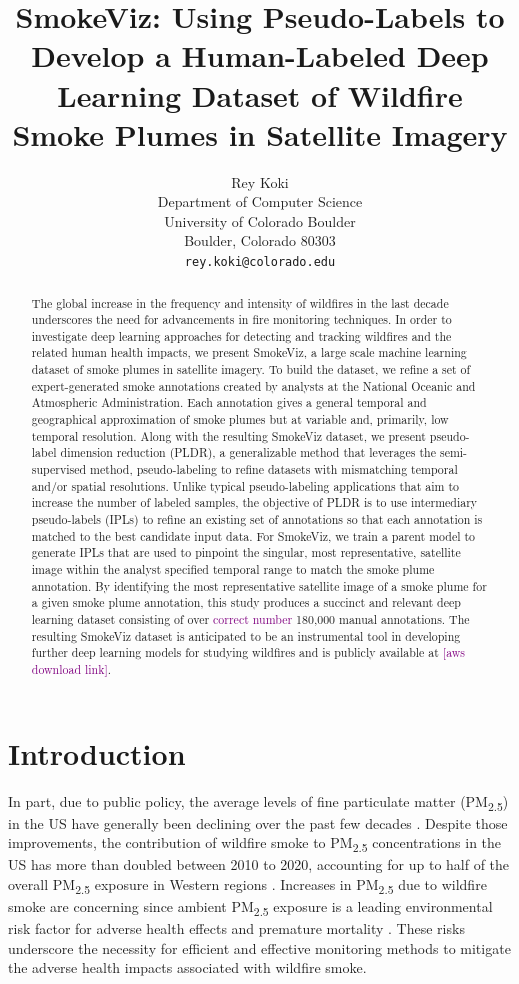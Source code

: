 \documentclass{article}
\title{SmokeViz: Using Pseudo-Labels to Develop a Human-Labeled Deep Learning Dataset of Wildfire Smoke Plumes in Satellite Imagery}
\author{%
  Rey Koki\\%
  Department of Computer Science\\
  University of Colorado Boulder\\
  Boulder, Colorado 80303\\
  \texttt{rey.koki@colorado.edu} \\
}
\newcommand\reynotes[1]{\textcolor{purple}{#1}}
\begin{document}
\maketitle


\begin{abstract}
    The global increase in the frequency and intensity of wildfires in the last decade underscores the need for advancements in fire monitoring techniques. In order to investigate deep learning approaches for detecting and tracking wildfires and the related human health impacts, we present SmokeViz, a large scale machine learning dataset of smoke plumes in satellite imagery. To build the dataset, we refine a set of expert-generated smoke annotations created by analysts at the National Oceanic and Atmospheric Administration. Each annotation gives a general temporal and geographical approximation of smoke plumes but at variable and, primarily, low temporal resolution. Along with the resulting SmokeViz dataset, we present pseudo-label dimension reduction (PLDR), a generalizable method that leverages the semi-supervised method, pseudo-labeling to refine datasets with mismatching temporal and/or spatial resolutions. Unlike typical pseudo-labeling applications that aim to increase the number of labeled samples, the objective of PLDR is to use intermediary pseudo-labels (IPLs) to refine an existing set of annotations so that each annotation is matched to the best candidate input data. For SmokeViz, we train a parent model to generate IPLs that are used to pinpoint the singular, most representative, satellite image within the analyst specified temporal range to match the smoke plume annotation. By identifying the most representative satellite image of a smoke plume for a given smoke plume annotation, this study produces a succinct and relevant deep learning dataset consisting of over \reynotes{correct number} 180,000 manual annotations. The resulting SmokeViz dataset is anticipated to be an instrumental tool in developing further deep learning models for studying wildfires and is publicly available at \reynotes{[aws download link]}.
\end{abstract}


\section{Introduction}

In part, due to public policy, the average levels of fine particulate matter (PM\textsubscript{2.5}) in the US have generally been declining over the past few decades \cite{clean_air_act}. Despite those improvements, the contribution of wildfire smoke to PM\textsubscript{2.5} concentrations in the US has more than doubled between 2010 to 2020, accounting for up to half of the overall PM\textsubscript{2.5} exposure in Western regions \cite{smoke_PM}. Increases in PM\textsubscript{2.5} due to wildfire smoke are concerning since ambient PM\textsubscript{2.5} exposure is a leading environmental risk factor for adverse health effects and premature mortality \cite{smoke_mortality}. These risks underscore the necessity for efficient and effective monitoring methods to mitigate the adverse health impacts associated with wildfire smoke. 
\end{document}
